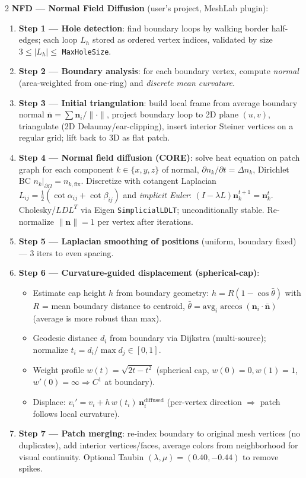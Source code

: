 \begin{paracol}{2}
\textbf{NFD — Normal Field Diffusion} (user's project, MeshLab plugin):
\begin{enumerate}[leftmargin=*,nosep]
  \item \textbf{Step 1 — Hole detection}: find boundary loops by walking border half-edges; each loop $L_h$ stored as ordered vertex indices, validated by size $3\le|L_h|\le$ \texttt{MaxHoleSize}.
  \item \textbf{Step 2 — Boundary analysis}: for each boundary vertex, compute \emph{normal} (area-weighted from one-ring) and \emph{discrete mean curvature}.
  \item \textbf{Step 3 — Initial triangulation}: build local frame from average boundary normal $\bar{\mathbf n}=\sum \mathbf n_i/\|\cdot\|$, project boundary loop to 2D plane $(u,v)$, triangulate (2D Delaunay/ear-clipping), insert interior Steiner vertices on a regular grid; lift back to 3D as flat patch.
  \item \textbf{Step 4 — Normal field diffusion (CORE)}: solve heat equation on patch graph for each component $k\in\{x,y,z\}$ of normal,
    $\partial n_k/\partial t = \Delta n_k$, Dirichlet BC $n_k|_{\partial\Omega}=n_{k,\text{fix}}$.
    Discretize with cotangent Laplacian $L_{ij}=\tfrac12(\cot\alpha_{ij}+\cot\beta_{ij})$ and \emph{implicit Euler}: $(I-\lambda L)\mathbf n_k^{t+1}=\mathbf n_k^t$. Cholesky/$LDL^T$ via Eigen \texttt{SimplicialLDLT}; unconditionally stable. Re-normalize $\|\mathbf n\|=1$ per vertex after iterations.
  \item \textbf{Step 5 — Laplacian smoothing of positions} (uniform, boundary fixed) — 3 iters to even spacing.
  \item \textbf{Step 6 — Curvature-guided displacement (spherical-cap)}:
    \begin{itemize}[leftmargin=1em,nosep]
      \item Estimate cap height $h$ from boundary geometry: $h = R(1-\cos\bar\theta)$ with $R$ = mean boundary distance to centroid, $\bar\theta = \mathrm{avg}_i\arccos(\mathbf n_i\!\cdot\!\bar{\mathbf n})$ (average is more robust than max).
      \item Geodesic distance $d_i$ from boundary via Dijkstra (multi-source); normalize $t_i = d_i/\max d_j\in[0,1]$.
      \item Weight profile $w(t)=\sqrt{2t-t^2}$ (spherical cap, $w(0)=0,w(1)=1$, $w'(0)=\infty\Rightarrow C^1$ at boundary).
      \item Displace: $v_i' = v_i + h\,w(t_i)\,\mathbf n_i^{\text{diffused}}$ (per-vertex direction $\Rightarrow$ patch follows local curvature).
    \end{itemize}
  \item \textbf{Step 7 — Patch merging}: re-index boundary to original mesh vertices (no duplicates), add interior vertices/faces, average colors from neighborhood for visual continuity. Optional Taubin $(\lambda,\mu)=(0.40,-0.44)$ to remove spikes.
\end{enumerate}


\end{paracol}

